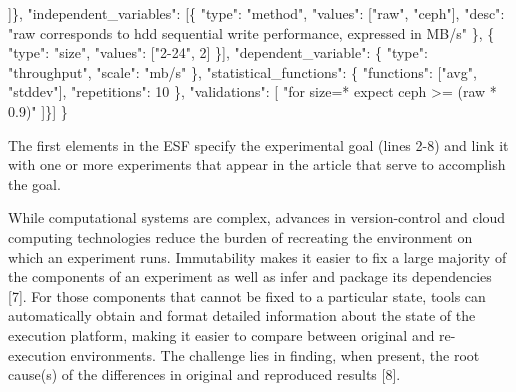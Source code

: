 \documentclass[10pt,reprint]{sigplanconf}
\newenvironment{Shaded}{\begin{snugshade}}{\end{snugshade}}
\newcommand{\DataTypeTok}[1]{\textcolor[rgb]{0.13,0.29,0.53}{{#1}}}
\newcommand{\DecValTok}[1]{\textcolor[rgb]{0.00,0.00,0.81}{{#1}}}
\newcommand{\StringTok}[1]{\textcolor[rgb]{0.31,0.60,0.02}{{#1}}}
\newcommand{\OtherTok}[1]{\textcolor[rgb]{0.56,0.35,0.01}{{#1}}}
\newcommand{\FunctionTok}[1]{\textcolor[rgb]{0.00,0.00,0.00}{{#1}}}
\begin{document}
\begin{Shaded}
\begin{Highlighting}[numbers=left,,]
     \OtherTok{]}\FunctionTok{\},}
     \DataTypeTok{"independent_variables"}\FunctionTok{:} \OtherTok{[}\FunctionTok{\{}
       \DataTypeTok{"type"}\FunctionTok{:} \StringTok{"method"}\FunctionTok{,}
       \DataTypeTok{"values"}\FunctionTok{:} \OtherTok{[}\StringTok{"raw"}\OtherTok{,} \StringTok{"ceph"}\OtherTok{]}\FunctionTok{,}
       \DataTypeTok{"desc"}\FunctionTok{:} \StringTok{"raw corresponds to hdd sequential write}
\StringTok{          performance, expressed in MB/s"}
     \FunctionTok{\}}\OtherTok{,} \FunctionTok{\{}
       \DataTypeTok{"type"}\FunctionTok{:} \StringTok{"size"}\FunctionTok{,}
       \DataTypeTok{"values"}\FunctionTok{:} \OtherTok{[}\StringTok{"2-24"}\OtherTok{,} \DecValTok{2}\OtherTok{]}
     \FunctionTok{\}}\OtherTok{]}\FunctionTok{,}
     \DataTypeTok{"dependent_variable"}\FunctionTok{:} \FunctionTok{\{}
       \DataTypeTok{"type"}\FunctionTok{:}  \StringTok{"throughput"}\FunctionTok{,}
       \DataTypeTok{"scale"}\FunctionTok{:} \StringTok{"mb/s"}
     \FunctionTok{\},}
     \DataTypeTok{"statistical_functions"}\FunctionTok{:} \FunctionTok{\{}
       \DataTypeTok{"functions"}\FunctionTok{:} \OtherTok{[}\StringTok{"avg"}\OtherTok{,} \StringTok{"stddev"}\OtherTok{]}\FunctionTok{,}
       \DataTypeTok{"repetitions"}\FunctionTok{:} \DecValTok{10}
     \FunctionTok{\},}
     \DataTypeTok{"validations"}\FunctionTok{:} \OtherTok{[}
       \StringTok{"for    size=*}
\StringTok{        expect ceph >= (raw * 0.9)"}
  \OtherTok{]}\FunctionTok{\}}\OtherTok{]}
\FunctionTok{\}}
\end{Highlighting}
\end{Shaded}


The first elements in the ESF specify the experimental goal (lines 2-8)
and link it with one or more experiments that appear in the article that
serve to accomplish the goal.


While computational systems are complex, advances in version-control and
cloud computing technologies reduce the burden of recreating the
environment on which an experiment runs. Immutability makes it easier to
fix a large majority of the components of an experiment as well as infer
and package its dependencies {[}7{]}. For those components that cannot
be fixed to a particular state, tools can automatically obtain and
format detailed information about the state of the execution platform,
making it easier to compare between original and re-execution
environments. The challenge lies in finding, when present, the root
cause(s) of the differences in original and reproduced results {[}8{]}.
\end{document}
